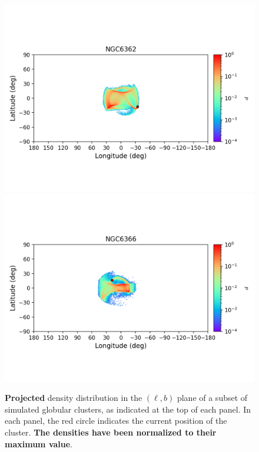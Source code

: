 \begin{figure}
        \includegraphics[clip=true, trim = 0mm 20mm 0mm 10mm, width=1\columnwidth]{images/error_plots_NGC6362.png}
        \includegraphics[clip=true, trim = 0mm 20mm 0mm 10mm, width=1\columnwidth]{images/error_plots_NGC6366.png}
        \caption[]{\textbf{Projected} density distribution in the $(\ell, b)$ plane of a subset of simulated globular clusters, as indicated at the top of each panel. In each panel, the red circle indicates the current position of the cluster. \textbf{The densities have been normalized to their maximum value}.}\label{stream10}
        \end{figure}

